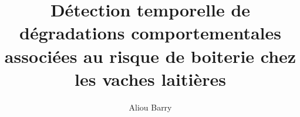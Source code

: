 \documentclass[11pt]{memoireuqam}
\begin{document}
\title{Détection temporelle de dégradations comportementales associées au risque de boiterie chez les vaches laitières}
\author{Aliou Barry}
\uqammemoire %
{}


\thispagestyle{empty}        %
\maketitle
{}




\tableofcontents %
\listoffigures
\listoftables

















\appendix %




\end{document}
